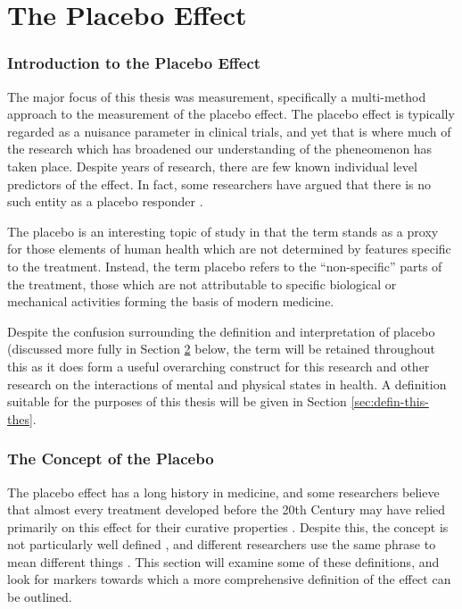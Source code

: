 \part{The Placebo Effect}

\section{Introduction to the Placebo Effect}
\label{sec:intr-plac-effect}


The major focus of this thesis was measurement, specifically a multi-method approach to the measurement of the placebo effect. The placebo effect is typically regarded as a nuisance parameter in clinical trials, and yet that is where much of the research which has broadened our understanding of the pheneomenon has taken place. Despite years of research, there are few known individual level predictors of the effect. In fact, some researchers have argued that there is no such entity as a placebo responder \cite{Kaptchuk2008a} . 

The placebo is an interesting topic of study in that the term stands as a proxy for those elements of human health which are not determined by  features specific to the treatment. Instead, the term placebo refers to the ``non-specific'' parts of the treatment, those which are not attributable to  specific biological or mechanical activities forming the basis of modern medicine. 

Despite the confusion surrounding the definition and interpretation of placebo (discussed more fully in Section \ref{sec:concept-placebo} below, the term will be retained throughout this  as it does form a useful overarching construct for this research and other research on the interactions of mental and physical states in health. A definition suitable for the purposes of this thesis will be given in Section \ref{sec:defin-this-thes}.

\section{The Concept of the Placebo}
\label{sec:concept-placebo}

The placebo effect has a long history in medicine, and some researchers believe that almost every treatment developed before the 20th Century may have relied primarily on this effect for their curative properties \cite{Shapiro1997,Macedo2003} . Despite this, the concept is not particularly well defined , and different researchers use the same phrase to mean different things \cite{Ernst1995b,hrobjartsson1996uncontrollable} . This section will examine some of these definitions, and look for markers towards which  a more comprehensive definition of the effect can be outlined.  

